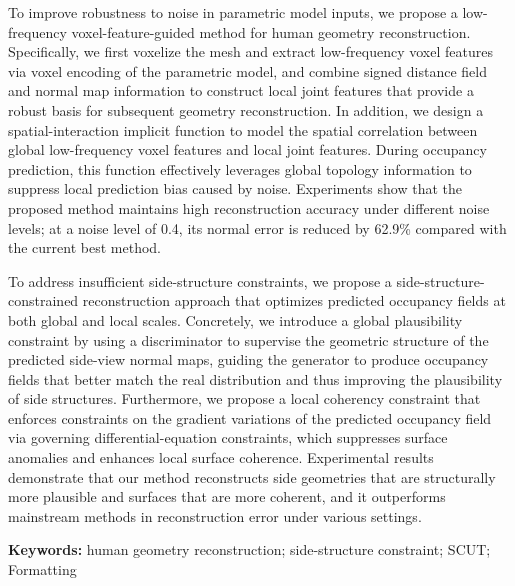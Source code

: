 To improve robustness to noise in parametric model inputs, we propose a low-frequency voxel-feature-guided method for human geometry reconstruction. Specifically, we first voxelize the mesh and extract low-frequency voxel features via voxel encoding of the parametric model, and combine signed distance field and normal map information to construct local joint features that provide a robust basis for subsequent geometry reconstruction. In addition, we design a spatial-interaction implicit function to model the spatial correlation between global low-frequency voxel features and local joint features. During occupancy prediction, this function effectively leverages global topology information to suppress local prediction bias caused by noise. Experiments show that the proposed method maintains high reconstruction accuracy under different noise levels; at a noise level of 0.4, its normal error is reduced by 62.9\% compared with the current best method.

To address insufficient side-structure constraints, we propose a side-structure-constrained reconstruction approach that optimizes predicted occupancy fields at both global and local scales. Concretely, we introduce a global plausibility constraint by using a discriminator to supervise the geometric structure of the predicted side-view normal maps, guiding the generator to produce occupancy fields that better match the real distribution and thus improving the plausibility of side structures. Furthermore, we propose a local coherency constraint that enforces constraints on the gradient variations of the predicted occupancy field via governing differential-equation constraints, which suppresses surface anomalies and enhances local surface coherence. Experimental results demonstrate that our method reconstructs side geometries that are structurally more plausible and surfaces that are more coherent, and it outperforms mainstream methods in reconstruction error under various settings.

\par \vspace{1em}
\noindent \textbf{Keywords:} human geometry reconstruction; side-structure constraint; SCUT; Formatting
